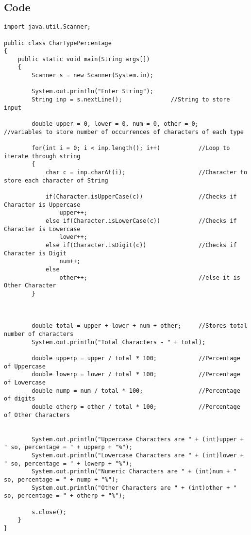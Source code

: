 \documentclass[ProgramminAssignment.tex]{subfiles}
\begin{document}
\subsection{Code}
\begin{lstlisting}
import java.util.Scanner;

public class CharTypePercentage
{
	public static void main(String args[])
	{
		Scanner s = new Scanner(System.in);
		
		System.out.println("Enter String");
		String inp = s.nextLine();				//String to store input
		
		double upper = 0, lower = 0, num = 0, other = 0;	//variables to store number of occurrences of characters of each type
		
		for(int i = 0; i < inp.length(); i++)			//Loop to iterate through string
		{
			char c = inp.charAt(i);						//Character to store each character of String
			
			if(Character.isUpperCase(c))				//Checks if Character is Uppercase
				upper++;
			else if(Character.isLowerCase(c))			//Checks if Character is Lowercase
				lower++;
			else if(Character.isDigit(c))				//Checks if Character is Digit
				num++;
			else
				other++;								//else it is Other Character
		}
		

		
		double total = upper + lower + num + other;		//Stores total number of characters
		System.out.println("Total Characters - " + total);
		
		double upperp = upper / total * 100;			//Percentage of Uppercase
		double lowerp = lower / total * 100;			//Percentage of Lowercase
		double nump = num / total * 100;				//Percentage of digits
		double otherp = other / total * 100;			//Percentage of Other Characters
		
		
		System.out.println("Uppercase Characters are " + (int)upper + " so, percentage = " + upperp + "%");
		System.out.println("Lowercase Characters are " + (int)lower + " so, percentage = " + lowerp + "%");
		System.out.println("Numeric Characters are " + (int)num + " so, percentage = " + nump + "%");
		System.out.println("Other Characters are " + (int)other + " so, percentage = " + otherp + "%");
		
		s.close();
	}
}

\end{lstlisting}
\end{document}

